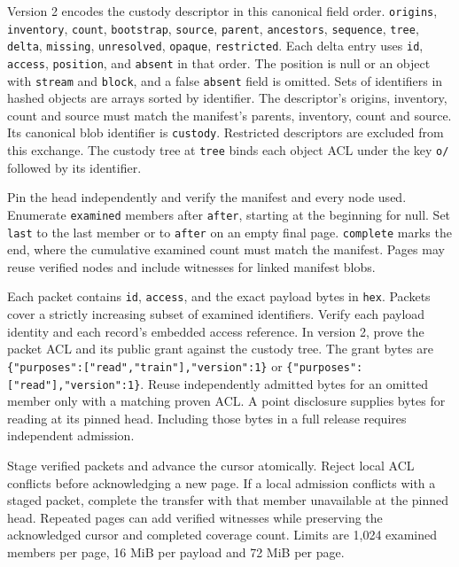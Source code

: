 \documentclass[11pt,a4paper]{article}
\newcommand{\topic}[1]{\par\smallskip{\sffamily\bfseries\color{ink}#1\par}\nobreak}
\begin{document}
Version 2 encodes the custody descriptor in this canonical field order. \texttt{origins}, \texttt{inventory}, \texttt{count}, \texttt{bootstrap}, \texttt{source}, \texttt{parent}, \texttt{ancestors}, \texttt{sequence}, \texttt{tree}, \texttt{delta}, \texttt{missing}, \texttt{unresolved}, \texttt{opaque}, \texttt{restricted}. Each delta entry uses \texttt{id}, \texttt{access}, \texttt{position}, and \texttt{absent} in that order. The position is null or an object with \texttt{stream} and \texttt{block}, and a false \texttt{absent} field is omitted. Sets of identifiers in hashed objects are arrays sorted by identifier. The descriptor's origins, inventory, count and source must match the manifest's parents, inventory, count and source. Its canonical blob identifier is \texttt{custody}. Restricted descriptors are excluded from this exchange. The custody tree at \texttt{tree} binds each object ACL under the key \texttt{o/} followed by its identifier.

\topic{Page admission}
Pin the head independently and verify the manifest and every node used. Enumerate \texttt{examined} members after \texttt{after}, starting at the beginning for null. Set \texttt{last} to the last member or to \texttt{after} on an empty final page. \texttt{complete} marks the end, where the cumulative examined count must match the manifest. Pages may reuse verified nodes and include witnesses for linked manifest blobs.

Each packet contains \texttt{id}, \texttt{access}, and the exact payload bytes in \texttt{hex}. Packets cover a strictly increasing subset of examined identifiers. Verify each payload identity and each record's embedded access reference. In version 2, prove the packet ACL and its public grant against the custody tree. The grant bytes are
\verb|{"purposes":["read","train"],"version":1}| or \verb|{"purposes":["read"],"version":1}|. Reuse independently admitted bytes for an omitted member only with a matching proven ACL. A point disclosure supplies bytes for reading at its pinned head. Including those bytes in a full release requires independent admission.

Stage verified packets and advance the cursor atomically. Reject local ACL conflicts before acknowledging a new page. If a local admission conflicts with a staged packet, complete the transfer with that member unavailable at the pinned head. Repeated pages can add verified witnesses while preserving the acknowledged cursor and completed coverage count. Limits are 1,024 examined members per page, 16 MiB per payload and 72 MiB per page.
\end{document}
